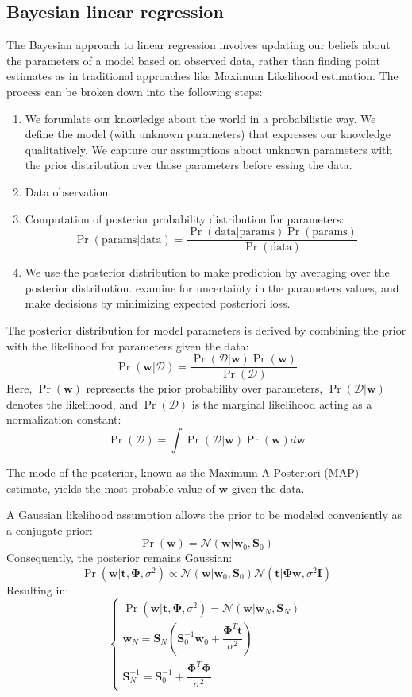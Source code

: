 \subsection{Bayesian linear regression}
The Bayesian approach to linear regression involves updating our beliefs about the parameters of a model based on observed data, rather than finding point estimates as in traditional approaches like Maximum Likelihood estimation.
The process can be broken down into the following steps:
\begin{enumerate}
    \item We forumlate our knowledge about the world in a probabilistic way.
        We define the model (with unknown parameters) that expresses our knowledge qualitatively.
        We capture our assumptions about unknown parameters with the prior distribution over those parameters before essing the data.
    \item Data observation.
    \item Computation of posterior probability distribution for parameters:
        \[\Pr(\text{params}|\text{data})=\dfrac{\Pr(\text{data}|\text{params})\Pr(\text{params})}{\Pr(\text{data})}\]
    \item We use the posterior distribution to make prediction by averaging over the posterior distribution. examine for uncertainty in the parameters values, and make decisions by minimizing expected posteriori loss. 
\end{enumerate}

The posterior distribution for model parameters is derived by combining the prior with the likelihood for parameters given the data:
\[\Pr(\mathbf{w}|\mathcal{D})=\dfrac{\Pr(\mathcal{D}|\mathbf{w})\Pr(\mathbf{w})}{\Pr(\mathcal{D})}\]
Here, $\Pr(\mathbf{w})$ represents the prior probability over parameters, $\Pr(\mathcal{D}|\mathbf{w})$ denotes the likelihood, and $\Pr(\mathcal{D})$ is the marginal likelihood acting as a normalization constant: 
\[\Pr(\mathcal{D})=\int\Pr(\mathcal{D}|\mathbf{w})\Pr(\mathbf{w})d\mathbf{w}\] 

The mode of the posterior, known as the Maximum A Posteriori (MAP) estimate, yields the most probable value of $\mathbf{w}$ given the data.

A Gaussian likelihood assumption allows the prior to be modeled conveniently as a conjugate prior:
\[\Pr(\mathbf{w})=\mathcal{N}(\mathbf{w}|\mathbf{w}_0,\mathbf{S}_0)\]
Consequently, the posterior remains Gaussian:
\[\Pr(\mathbf{w}|\mathbf{t},\boldsymbol{\Phi},\sigma^2)\varpropto \mathcal{N}(\mathbf{w}|\mathbf{w}_0,\mathbf{S}_0)\mathcal{N}(\mathbf{t}|\boldsymbol{\Phi}\mathbf{w},\sigma^2\mathbf{I})\]
Resulting in:
\[\begin{cases}
    \Pr(\mathbf{w}|\mathbf{t},\boldsymbol{\Phi},\sigma^2)=\mathcal{N}(\mathbf{w}|\mathbf{w}_N,\mathbf{S}_N) \\
    \mathbf{w}_N=\mathbf{S}_N\left(\mathbf{S}_0^{-1}\mathbf{w}_0+\dfrac{\boldsymbol{\Phi}^T\mathbf{t}}{\sigma^2}\right) \\
    \mathbf{S}_N^{-1}=\mathbf{S}_0^{-1}+\dfrac{\boldsymbol{\Phi}^T\boldsymbol{\Phi}}{\sigma^2}
\end{cases}\]

